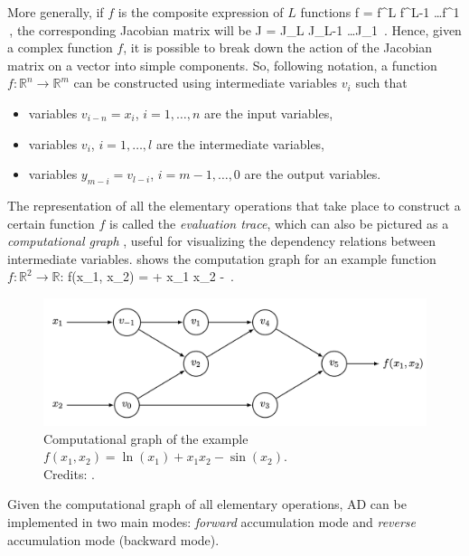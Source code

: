 More generally, if $f$ is the composite expression of $L$ functions
\be
\label{eq:4.3}
f = f^L \circ f^{L-1} \circ \ldots \circ f^1 \,,
\ee
the corresponding Jacobian matrix will be
\be
\label{eq:4.4}
J = J_L \cdot J_{L-1} \cdot \ldots \cdot J_1 \,.
\ee
Hence, given a complex function $f$, it is possible to break down the action of the Jacobian matrix on a vector into simple components.
So, following \cite{griewank_evaluating_2008} notation, a function $f : \mathbb{R}^n \rightarrow \mathbb{R}^m$ can be constructed using intermediate variables $v_i$ such that
\begin{itemize}
    \item variables $v_{i-n} = x_i$, $i = 1, \ldots, n$ are the input variables,
    \item variables $v_{i}$, $i = 1, \ldots, l$ are the intermediate variables,
    \item variables $y_{m-i} = v_{l-i}$, $i = m-1, \ldots, 0$ are the output variables.
\end{itemize}
The representation of all the elementary operations that take place to construct a certain function $f$ is called the \emph{evaluation trace}, which can also be pictured as a \emph{computational graph} \citep{bauer_computational_1974}, useful for visualizing the dependency relations between intermediate variables.  shows the computation graph for an example function $f : \mathbb{R}^2 \rightarrow \mathbb{R}$: 
\be
\label{eq:4.5}
f(x_1, x_2) =  + x_1 x_2 -  \,.
\ee

\begin{figure}
    \centering
    \includegraphics[width=0.9\linewidth, keepaspectratio]{img//chapter4/computational_graph.png}
    \caption[Example of computational graph]{Computational graph of the example $f(x_1, x_2) = \ln{(x_1)} + x_1 x_2 - \sin{(x_2)}$.\\\small{Credits: \cite{baydin_automatic_2018}.}}
    \label{fig:computational_graph}
\end{figure}

Given the computational graph of all elementary operations, AD can be implemented in two main modes: \emph{forward} accumulation mode and \emph{reverse} accumulation mode (backward mode).


